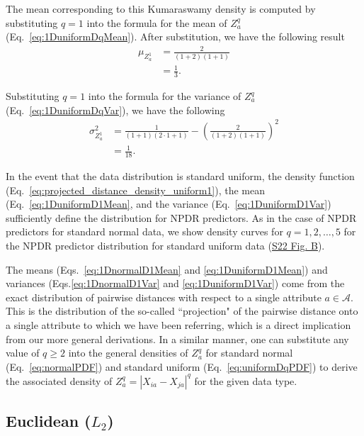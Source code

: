 \documentclass[10pt,letterpaper]{article}
\begin{document}
The mean corresponding to this Kumaraswamy density is computed by substituting $q=1$ into the formula for the mean of $Z^q_a$ (Eq.~\ref{eq:1DuniformDqMean}). After substitution, we have the following result
%
\begin{equation}\label{eq:1DuniformD1Mean}
\begin{aligned}
\mu_{Z^1_a} &= \frac{2}{(1 + 2)(1 + 1)} \\
&= \frac{1}{3}.
\end{aligned}
\end{equation}

Substituting $q=1$ into the formula for the variance of $Z^q_a$ (Eq.~\ref{eq:1DuniformDqVar}), we have the following
%
\begin{equation}\label{eq:1DuniformD1Var}
\begin{aligned}
\sigma^2_{Z^1_a} &= \frac{1}{(1 + 1)(2\cdot 1 + 1)} - \left(\frac{2}{(1 + 2)(1 + 1)}\right)^2 \\
&= \frac{1}{18}.
\end{aligned}
\end{equation}

In the event that the data distribution is standard uniform, the density function (Eq.~\ref{eq:projected_distance_density_uniform1}), the mean (Eq.~\ref{eq:1DuniformD1Mean}, and the variance (Eq.~\ref{eq:1DuniformD1Var}) sufficiently define the distribution for NPDR predictors. As in the case of NPDR predictors for standard normal data, we show density curves for $q=1,2,\dots,5$ for the NPDR predictor distribution for standard uniform data (\hyperlink{S22_Fig}{S22 Fig. B}). 

The means (Eqs.~\ref{eq:1DnormalD1Mean} and \ref{eq:1DuniformD1Mean}) and variances (Eqs.\ref{eq:1DnormalD1Var} and \ref{eq:1DuniformD1Var}) come from the exact distribution of pairwise distances with respect to a single attribute $a \in \mathcal{A}$. This is the distribution of the so-called ``projection" of the pairwise distance onto a single attribute to which we have been referring, which is a direct implication from our more general derivations. In a similar manner, one can substitute any value of $q \geq 2$ into the general densities of $Z^q_a$ for standard normal (Eq.~\ref{eq:normalPDF}) and standard uniform (Eq.~\ref{eq:uniformDqPDF}) to derive the associated density of $Z^q_a = |X_{ia} - X_{ja}|^q$ for the given data type.

\subsection{Euclidean \texorpdfstring{($L_2$)}{}}
\end{document}
